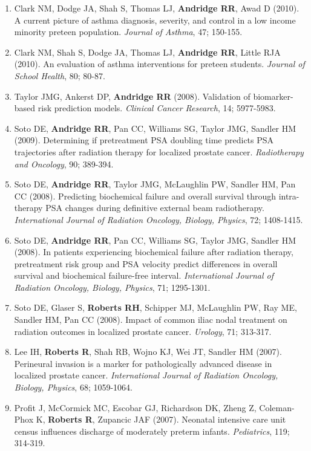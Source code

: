 \documentclass[
  english,
  letterpaper,
  DIV=11,
  numbers=noendperiod]{scrartcl}
\begin{document}
\begin{enumerate}
  Clark NM, Dodge JA, Thomas LJ, \textbf{Andridge RR}, Awad D, Paton JY
  (2010). Asthma in 10- to 13-year olds: Challenges at a time of
  transition. \emph{Clinical Pediatrics}, 49; 931-937.
\item
  Clark NM, Dodge JA, Shah S, Thomas LJ, \textbf{Andridge RR}, Awad D
  (2010). A current picture of asthma diagnosis, severity, and control
  in a low income minority preteen population. \emph{Journal of Asthma},
  47; 150-155.
\item
  Clark NM, Shah S, Dodge JA, Thomas LJ, \textbf{Andridge RR}, Little
  RJA (2010). An evaluation of asthma interventions for preteen
  students. \emph{Journal of School Health}, 80; 80-87.
\item
  Taylor JMG, Ankerst DP, \textbf{Andridge RR} (2008). Validation of
  biomarker-based risk prediction models. \emph{Clinical Cancer
  Research}, 14; 5977-5983.
\item
  Soto DE, \textbf{Andridge RR}, Pan CC, Williams SG, Taylor JMG,
  Sandler HM (2009). Determining if pretreatment PSA doubling time
  predicts PSA trajectories after radiation therapy for localized
  prostate cancer. \emph{Radiotherapy and Oncology}, 90; 389-394.
\item
  Soto DE, \textbf{Andridge RR}, Taylor JMG, McLaughlin PW, Sandler HM,
  Pan CC (2008). Predicting biochemical failure and overall survival
  through intra-therapy PSA changes during definitive external beam
  radiotherapy. \emph{International Journal of Radiation Oncology,
  Biology, Physics}, 72; 1408-1415.
\item
  Soto DE, \textbf{Andridge RR}, Pan CC, Williams SG, Taylor JMG,
  Sandler HM (2008). In patients experiencing biochemical failure after
  radiation therapy, pretreatment risk group and PSA velocity predict
  differences in overall survival and biochemical failure-free interval.
  \emph{International Journal of Radiation Oncology, Biology, Physics},
  71; 1295-1301.
\item
  Soto DE, Glaser S, \textbf{Roberts RH}, Schipper MJ, McLaughlin PW,
  Ray ME, Sandler HM, Pan CC (2008). Impact of common iliac nodal
  treatment on radiation outcomes in localized prostate cancer.
  \emph{Urology}, 71; 313-317.
\item
  Lee IH, \textbf{Roberts R}, Shah RB, Wojno KJ, Wei JT, Sandler HM
  (2007). Perineural invasion is a marker for pathologically advanced
  disease in localized prostate cancer. \emph{International Journal of
  Radiation Oncology, Biology, Physics}, 68; 1059-1064.
\item
  Profit J, McCormick MC, Escobar GJ, Richardson DK, Zheng Z,
  Coleman-Phox K, \textbf{Roberts R}, Zupancic JAF (2007). Neonatal
  intensive care unit census influences discharge of moderately preterm
  infants. \emph{Pediatrics}, 119; 314-319.
\end{enumerate}
\end{document}
